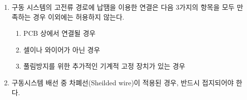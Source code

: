 \documentclass[final,a4paper,10pt]{report}
\begin{document}
\begin{enumerate}
  \item\label{rule:formula-technical.tractive-system-wiring.solder-connection-exceptions} 구동 시스템의 고전류 경로에 납땜을 이용한 연결은 다음 3가지의 항목을 모두 만족하는 경우 이외에는 허용하지 않는다.
    \begin{enumerate}
      \item\label{rule:formula-technical.tractive-system-wiring.solder-connection-exceptions.on-pcb} PCB 상에서 연결될 경우
      \item\label{rule:formula-technical.tractive-system-wiring.solder-connection-exceptions.not-cell-or-wire} 셀이나 와이어가 아닌 경우
      \item\label{rule:formula-technical.tractive-system-wiring.solder-connection-exceptions.extra-mechanical-lock} 풀림방지를 위한 추가적인 기계적 고정 장치가 있는 경우
    \end{enumerate}

  \item\label{rule:formula-technical.tractive-system-wiring.shielded-wire-grounding} {\color{blue}구동시스템 배선 중 차폐선(Sheilded wire)이 적용된 경우, 반드시 접지되어야 한다.}
\end{enumerate}
\end{document}
